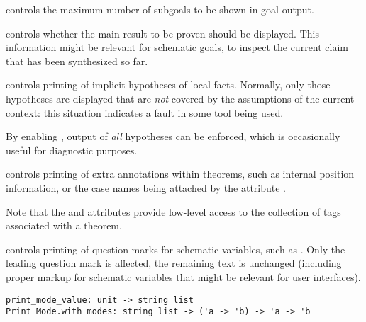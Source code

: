 \begin{isabellebody}
\begin{isamarkuptext}
\begin{description}
  \item \hyperlink{attribute.goals-limit}{\mbox{}} controls the maximum number of
  subgoals to be shown in goal output.

  \item \hyperlink{attribute.show-main-goal}{\mbox{}} controls whether the main result
  to be proven should be displayed.  This information might be
  relevant for schematic goals, to inspect the current claim that has
  been synthesized so far.

  \item \hyperlink{attribute.show-hyps}{\mbox{}} controls printing of implicit
  hypotheses of local facts.  Normally, only those hypotheses are
  displayed that are \emph{not} covered by the assumptions of the
  current context: this situation indicates a fault in some tool being
  used.

  By enabling \hyperlink{attribute.show-hyps}{\mbox{}}, output of \emph{all} hypotheses
  can be enforced, which is occasionally useful for diagnostic
  purposes.

  \item \hyperlink{attribute.show-tags}{\mbox{}} controls printing of extra annotations
  within theorems, such as internal position information, or the case
  names being attached by the attribute \hyperlink{attribute.case-names}{\mbox{}}.

  Note that the \hyperlink{attribute.tagged}{\mbox{}} and \hyperlink{attribute.untagged}{\mbox{}}
  attributes provide low-level access to the collection of tags
  associated with a theorem.

  \item \hyperlink{attribute.show-question-marks}{\mbox{}} controls printing of question
  marks for schematic variables, such as .  Only the leading
  question mark is affected, the remaining text is unchanged
  (including proper markup for schematic variables that might be
  relevant for user interfaces).

  \end{description}%
\end{isamarkuptext}%
\isamarkuptrue%
%
\isamarkuptrue%
%
\begin{isamarkuptext}%
\begin{mldecls}
    \verb|print_mode_value: unit -> string list| \\
    \verb|Print_Mode.with_modes: string list -> ('a -> 'b) -> 'a -> 'b| \\
  \end{mldecls}


\end{isamarkuptext}
\end{isabellebody}
